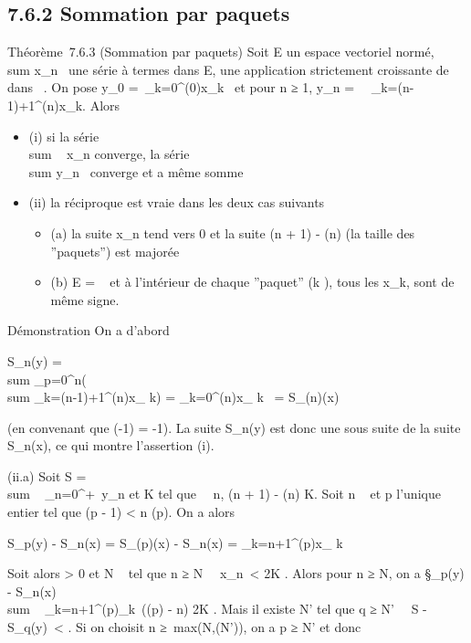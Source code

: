 \documentclass[]{article}
\begin{document}
\subsection{7.6.2 Sommation par paquets}

Théorème~7.6.3 (Sommation par paquets) Soit E un espace vectoriel normé,
\\sum  x_n~ une
série à termes dans E, \phi une application strictement croissante de ~
dans ~. On pose y_0 =\
\sum  _k=0^\phi(0)x_k~ et
pour n ≥ 1, y_n =\
\sum ~
_k=\phi(n-1)+1^\phi(n)x_k. Alors

\begin{itemize}
\itemsep1pt\parskip0pt
\item
  (i) si la série \\sum ~
  x_n converge, la série
  \\sum  y_n~
  converge et a même somme
\item
  (ii) la réciproque est vraie dans les deux cas suivants

  \begin{itemize}
  \itemsep1pt\parskip0pt
  \item
    (a) la suite x_n tend vers 0 et la suite \phi(n + 1) - \phi(n)
    (la taille des ''paquets'') est majorée
  \item
    (b) E = ~ et à l'intérieur de chaque ''paquet'' (k ), tous les x_k, sont de même signe.
  \end{itemize}
\end{itemize}

Démonstration On a d'abord

S_n(y) = \\sum
_p=0^n(\\sum
_k=\phi(n-1)+1^\phi(n)x_ k) =
\sum _k=0^\phi(n)x_ k~ =
S_\phi(n)(x)

(en convenant que \phi(-1) = -1). La suite S_n(y) est donc une
sous suite de la suite S_n(x), ce qui montre l'assertion (i).

(ii.a) Soit S = \\sum ~
_n=0^+\infty~y_n et K tel que
\forall~~n, \phi(n + 1) - \phi(n) \leq K. Soit n \in {}~ et p
l'unique entier tel que \phi(p - 1) < n \leq \phi(p). On a alors

S_p(y) - S_n(x) = S_\phi(p)(x) - S_n(x)
= \sum _k=n+1^\phi(p)x_ k~

Soit alors \epsilon > 0 et N \in {}~ tel que n ≥ N
\rigtharrow~_n\
< \epsilon {}K . Alors pour n ≥ N, on a
\S_p(y) -
S_n(x)\
\leq\\sum ~
_k=n+1^\phi(p)\x_k\
\leq (\phi(p) - n) \epsilon \over 2K \leq \epsilon \over
2 . Mais il existe N' tel que q ≥ N' \rigtharrow~\ S -
S_q(y)\ < \epsilon
\over 2 . Si on choisit n ≥\
max(N,\phi(N')), on a p ≥ N' et donc
\end{document}

